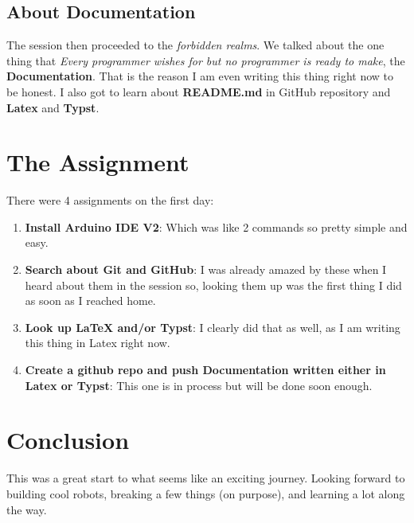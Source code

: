 \documentclass[12pt]{article}
\begin{document}
\subsection{About Documentation}
The session then proceeded to the \textit{forbidden realms}. We talked about the one thing that \textit{Every programmer wishes for but no programmer is ready to make}, the \textbf{Documentation}. That is the reason I am even writing this thing right now to be honest. I also got to learn about \textbf{README.md} in GitHub repository and \textbf{Latex} and \textbf{Typst}.

\section{The Assignment}
There were 4 assignments on the first day:
\begin{enumerate}
    \item \textbf{Install Arduino IDE V2}:
    Which was like 2 commands so pretty simple and easy.
    \item \textbf{Search about Git and GitHub}:
    I was already amazed by these when I heard about them in the session so, looking them up was the first thing I did as soon as I reached home.
    \item \textbf{Look up LaTeX and/or Typst}:
    I clearly did that as well, as I am writing this thing in Latex right now.
    \item \textbf{Create a github repo and push Documentation written either in Latex or Typst}:
    This one is in process but will be done soon enough.
\end{enumerate}

\section{Conclusion}
This was a great start to what seems like an exciting journey.  
Looking forward to building cool robots, breaking a few things (on purpose), and learning a lot along the way.
\end{document}
